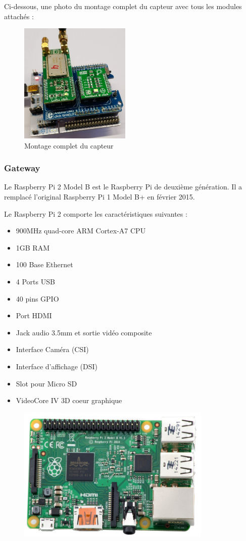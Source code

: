 \documentclass[12pt]{article}
\begin{document}
Ci-dessous, une photo du montage complet du capteur avec tous les modules attachés :
\begin{figure}[!h]
	\centering
	\includegraphics[width=200px]{montage}
	\caption{Montage complet du capteur}
	\label{}
\end{figure}

\newpage
\subsubsection{Gateway}

Le Raspberry Pi 2 Model B est le Raspberry Pi de deuxième génération. Il a remplacé l'original Raspberry Pi 1 Model B+ en février 2015.

Le Raspberry Pi 2 comporte les caractéristiques suivantes :

\begin{itemize}
	\item 900MHz quad-core ARM Cortex-A7 CPU
	\item 1GB RAM
	\item 100 Base Ethernet
	\item 4 Ports USB
	\item 40 pins GPIO
	\item Port HDMI
	\item Jack audio 3.5mm et sortie vidéo composite
	\item Interface Caméra (CSI)
	\item Interface d'affichage (DSI)
	\item Slot pour Micro SD
	\item VideoCore IV 3D coeur graphique
\end{itemize}



\begin{figure}[!h]
	\centering
	\includegraphics[width=350px]{raspberry}
	\caption{}
	\label{}
\end{figure}
\end{document}
